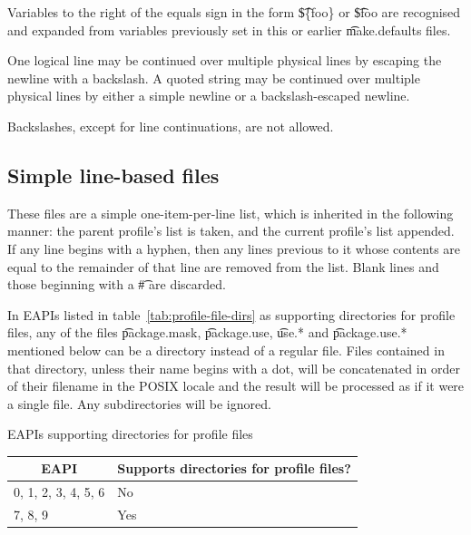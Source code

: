 \begin{compactitem}
\item Variables to the right of the equals sign in the form \t{\$\{foo\}} or \t{\$foo} are
    recognised and expanded from variables previously set in this or earlier \t{make.defaults}
    files.
\item One logical line may be continued over multiple physical lines by escaping the newline with
    a backslash. A quoted string may be continued over multiple physical lines by either a simple
    newline or a backslash-escaped newline.
\item Backslashes, except for line continuations, are not allowed.
\end{compactitem}

\subsection{Simple line-based files}
\label{sec:line-stacking}
These files are a simple one-item-per-line list, which is inherited in the following manner: the
parent profile's list is taken, and the current profile's list appended. If any line begins with a
hyphen, then any lines previous to it whose contents are equal to the remainder of that line are
removed from the list. Blank lines and those beginning with a \t{\#} are discarded.

 In EAPIs listed in table~\ref{tab:profile-file-dirs} as supporting
directories for profile files, any of the files \t{package.mask}, \t{package.use}, \t{use.*} and
\t{package.use.*} mentioned below can be a directory instead of a regular file. Files contained
in that directory, unless their name begins with a dot, will be concatenated in order of their
filename in the POSIX locale and the result will be processed as if it were a single file.
Any subdirectories will be ignored.

\begin{centertable}{EAPIs supporting directories for profile files}
    \label{tab:profile-file-dirs}
    \begin{tabular}{ll}
      \toprule
      \multicolumn{1}{c}{\textbf{EAPI}} &
      \multicolumn{1}{c}{\textbf{Supports directories for profile files?}} \\
      \midrule
      0, 1, 2, 3, 4, 5, 6 & No  \\
      7, 8, 9             & Yes \\
      \bottomrule
    \end{tabular}
\end{centertable}


